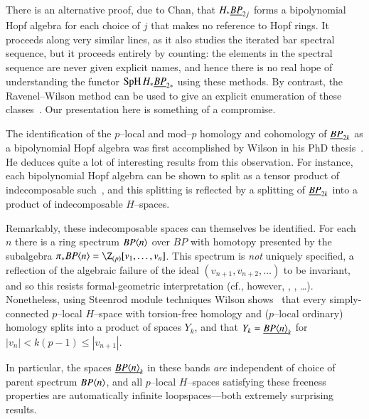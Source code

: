 \begin{remark}
There is an alternative proof, due to Chan, that $H_* \underline{\smash{BP}}_{2j}$ forms a bipolynomial Hopf algebra for each choice of $j$ that makes no reference to Hopf rings.  It proceeds along very similar lines, as it also studies the iterated bar spectral sequence, but it proceeds entirely by counting: the elements in the spectral sequence are never given explicit names, and hence there is no real hope of understanding the functor $\operatorname{SpH} H_* \underline{\smash{BP}}_{2*}$ using these methods.  By contrast, the Ravenel--Wilson method can be used to give an explicit enumeration of these classes~\cite[Section 5]{RavenelWilsonHopfRingForMU}.  Our presentation here is something of a compromise.
\end{remark}

\begin{remark}\label{WilsonSpaces}
The identification of the $p$--local and mod--$p$ homology and cohomology of $\underline{\smash{BP}}_{2k}$ as a bipolynomial Hopf algebra was first accomplished by Wilson in his PhD thesis~\cite[Theorem 3.3]{WilsonThesisI}.  He deduces quite a lot of interesting results from this observation.  For instance, each bipolynomial Hopf algebra can be shown to split as a tensor product of indecomposable such~\cite[Proposition 3.5]{WilsonThesisI}, and this splitting is reflected by a splitting of $\underline{\smash{BP}}_{2k}$ into a product of indecomposable $H$--spaces.

Remarkably, these indecomposable spaces can themselves be identified.  For each $n$ there is a ring spectrum $BP\langle n\rangle$ over $BP$ with homotopy presented by the subalgebra $\pi_* BP\<n\> = \Z_{(p)}[v_1, \ldots, v_n]$.  This spectrum is \emph{not} uniquely specified, a reflection of the algebraic failure of the ideal $(v_{n+1}, v_{n+2}, \ldots)$ to be invariant, and so this resists formal-geometric interpretation (cf., however, \cite{LawsonNaumann}, \cite{StricklandProductsOnModules}, \ldots).  Nonetheless, using Steenrod module techniques Wilson shows~\cite[Section 6]{WilsonThesisII} that every simply-connected $p$--local $H$--space with torsion-free homology and ($p$--local ordinary) homology splits into a product of spaces $Y_k$, and that $Y_k = \underline{\smash{BP\langle n\rangle}}_{k}$ for $|v_n| < k(p-1) \le |v_{n+1}|$.

In particular, the spaces $\underline{\smash{BP\langle n\rangle}}_{k}$ in these bands \emph{are} independent of choice of parent spectrum $BP\langle n\rangle$, and all $p$--local $H$--spaces satisfying these freeness properties are automatically infinite loopspaces---both extremely surprising results.
\end{remark}


